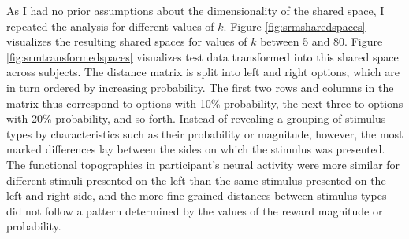 As I had no prior assumptions about the dimensionality of the shared space, I repeated the analysis for different values of $k$.
Figure \ref{fig:srmsharedspaces} visualizes the resulting shared spaces for values of $k$ between 5 and 80.
Figure \ref{fig:srmtransformedspaces} visualizes test data transformed into this shared space across subjects.
The distance matrix is split into left and right options, which are in turn ordered by increasing probability.
The first two rows and columns in the matrix thus correspond to options with 10\% probability, the next three to options with 20\% probability, and so forth.
Instead of revealing a grouping of stimulus types by characteristics such as their probability or magnitude, however, the most marked differences lay between the sides on which the stimulus was presented.
The functional topographies in participant's neural activity were more similar for different stimuli presented on the left than the same stimulus presented on the left and right side, and the more fine-grained distances between stimulus types did not follow a pattern determined by the values of the reward magnitude or probability.


